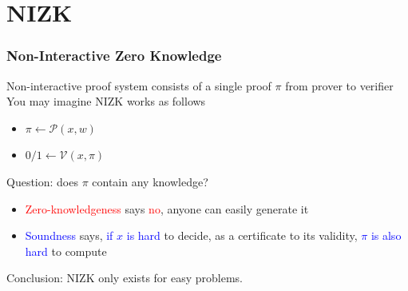 \documentclass{beamer}
\newcommand{\blue}[1]{\textcolor{blue}{#1}}
\newcommand{\dgreen}[1]{\textcolor{dgreen}{#1}}
\newcommand{\red}[1]{\textcolor{red}{#1}}
\begin{document}
\section{NIZK}

\frame
{
  \frametitle{Non-Interactive Zero Knowledge}
  \onslide<+-> Non-interactive proof system consists of a single proof $\pi$ from prover to verifier\\\vspace{0.3cm}
  \onslide<+-> You may imagine NIZK works as follows
  \begin{itemize}
    \item<+-> $\pi\leftarrow\mathcal{P}(x,w)$
    \item<+-> $0/1\leftarrow\mathcal{V}(x,\pi)$
  \end{itemize}
  \onslide<+-> Question: does $\pi$ contain any knowledge?
  \begin{itemize}
    \item<+-> \red{Zero-knowledgeness} says \red{no}, anyone can easily generate it
    \item<+-> \blue{Soundness} says, \blue{if $x$ is hard} to decide, as a certificate to its validity, \blue{$\pi$ is also hard} to compute
  \end{itemize}
  \onslide<+-> Conclusion: NIZK only exists for easy problems.
}
\end{document}
